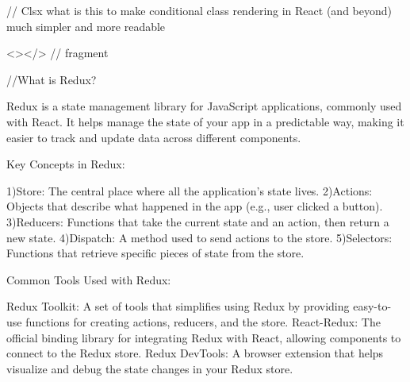 // Clsx   what is this 
to make conditional class rendering in React (and beyond) much simpler and more readable

<></>  // fragment


//What is Redux?

Redux is a state management library for JavaScript applications, commonly used with React. It helps manage the state of your app in a predictable way,
making it easier to track and update data across different components.

Key Concepts in Redux:

1)Store: The central place where all the application's state lives.
2)Actions: Objects that describe what happened in the app (e.g., user clicked a button).
3)Reducers: Functions that take the current state and an action, then return a new state.
4)Dispatch: A method used to send actions to the store.
5)Selectors: Functions that retrieve specific pieces of state from the store.

Common Tools Used with Redux:

Redux Toolkit: A set of tools that simplifies using Redux by providing easy-to-use functions for creating actions, reducers, and the store.
React-Redux: The official binding library for integrating Redux with React, allowing components to connect to the Redux store.
Redux DevTools: A browser extension that helps visualize and debug the state changes in your Redux store.

